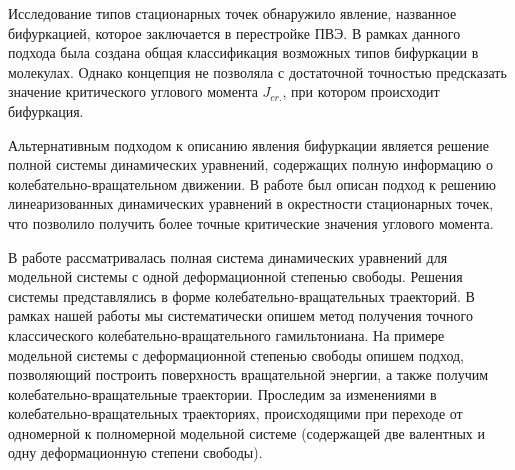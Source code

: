 Исследование типов стационарных точек обнаружило явление, названное бифуркацией, которое заключается в перестройке ПВЭ. В рамках данного подхода была создана общая классификация возможных типов бифуркации в молекулах. Однако концепция не позволяла с достаточной точностью предсказать значение критического углового момента $J_{cr.}$, при котором происходит бифуркация. \par
Альтернативным подходом к описанию явления бифуркации является решение полной системы динамических уравнений, содержащих полную информацию о колебательно-вращательном движении. В работе \cite{koz1996}  был описан подход к решению линеаризованных динамических уравнений в окрестности стационарных точек, что позволило получить более точные критические значения углового момента. \par
В работе \cite{petrov2015} рассматривалась полная система динамических уравнений для модельной системы с одной деформационной степенью свободы. Решения системы представлялись в форме колебательно-вращательных траекторий. В рамках нашей работы мы систематически опишем метод получения точного классического колебательно-вращательного гамильтониана. На примере модельной системы с деформационной степенью свободы опишем подход, позволяющий построить поверхность вращательной энергии, а также получим колебательно-вращательные траектории. Проследим за изменениями в колебательно-вращательных траекториях, происходящими при переходе от одномерной к полномерной модельной системе (содержащей две валентных и одну деформационную степени свободы). 